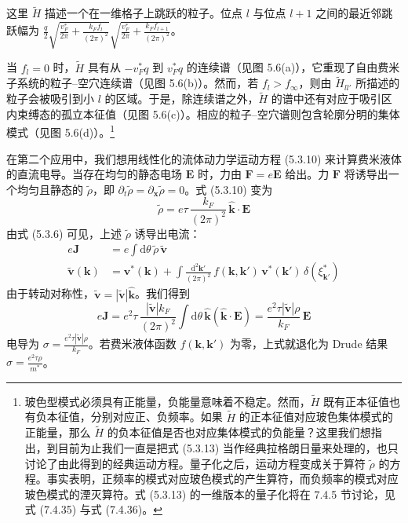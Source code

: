 这里 $\tilde{H}$ 描述一个在一维格子上跳跃的粒子。位点 $l$ 与位点 $l+1$ 之间的最近邻跳跃幅为
$\frac{q}{2}\sqrt{\frac{v_{F}^{*}}{2\pi}+\frac{k_{F}f_{l}}{(2\pi)^{2}}}\sqrt{\frac{v_{F}^{*}}{2\pi}+\frac{k_{F}f_{l+1}}{(2\pi)^{2}}}$。


当 $f_{l}=0$ 时，$\tilde{H}$ 具有从 $-v_{F}^{*}q$ 到 $v_{F}^{*}q$ 的连续谱（见图 5.6(a)），它重现了自由费米子系统的粒子--空穴连续谱（见图 5.6(b)）。然而，若 $f_{l}>f_{\infty}$，则由 $\tilde{H}_{ll'}$ 所描述的粒子会被吸引到小 $l$ 的区域。于是，除连续谱之外，$\tilde{H}$ 的谱中还有对应于吸引区内束缚态的孤立本征值（见图 5.6(c)）。相应的粒子--空穴谱则包含轮廓分明的集体模式（见图 5.6(d)）。\footnote{玻色型模式必须具有正能量，负能量意味着不稳定。然而，$\tilde{H}$ 既有正本征值也有负本征值，分别对应正、负频率。如果 $\tilde{H}$ 的正本征值对应玻色集体模式的正能量，那么 $\tilde{H}$ 的负本征值是否也对应集体模式的负能量？这里我们想指出，到目前为止我们一直是把式 (5.3.13) 当作经典拉格朗日量来处理的，也只讨论了由此得到的经典运动方程。量子化之后，运动方程变成关于算符 $\tilde{\rho}$ 的方程。事实表明，正频率的模式对应玻色模式的产生算符，而负频率的模式对应玻色模式的湮灭算符。式 (5.3.13) 的一维版本的量子化将在 7.4.5 节讨论，见式 (7.4.35) 与式 (7.4.36)。}

在第二个应用中，我们想用线性化的流体动力学运动方程 (5.3.10) 来计算费米液体的直流电导。当存在均匀的静态电场 $\pmb{E}$ 时，力由 $\pmb{F}=e\pmb{E}$ 给出。力 $\pmb{F}$ 将诱导出一个均匀且静态的 $\tilde{\rho}$，即 $\partial_{t}\tilde{\rho}=\partial_{\pmb{x}}\tilde{\rho}=0$。式 (5.3.10) 变为
\begin{equation*}
\tilde{\rho}=e\tau\,\frac{k_{F}}{(2\pi)^{2}}\,\hat{\pmb{k}}\cdot\pmb{E}
\end{equation*}
由式 (5.3.6) 可见，上述 $\tilde{\rho}$ 诱导出电流：
\begin{align*}
e\pmb{J} &= e\int \mathrm{d}\theta\,\tilde{\rho}\,\tilde{\pmb{v}}\\
\tilde{\pmb{v}}(\pmb{k}) &= \pmb{v}^{*}(\pmb{k})+\int \frac{\mathrm{d}^{2}\pmb{k}'}{(2\pi)^{2}}\,f(\pmb{k},\pmb{k}')\,\pmb{v}^{*}(\pmb{k}')\,\delta(\xi_{\pmb{k}'}^{*})
\end{align*}
由于转动对称性，$\tilde{\pmb{v}}=|\tilde{\pmb{v}}|\hat{\pmb{k}}$。我们得到
\begin{equation*}
e\pmb{J}=e^{2}\tau\,\frac{|\tilde{\pmb{v}}|k_{F}}{(2\pi)^{2}}\int \mathrm{d}\theta\,\hat{\pmb{k}}(\hat{\pmb{k}}\cdot\pmb{E})=\frac{e^{2}\tau|\tilde{\pmb{v}}|\rho}{k_{F}}\,\pmb{E}
\end{equation*}
电导为 $\sigma=\frac{e^{2}\tau|\tilde{\pmb{v}}|\rho}{k_{F}}$。若费米液体函数 $f(\pmb{k},\pmb{k}')$ 为零，上式就退化为 Drude 结果 $\sigma=\frac{e^{2}\tau\rho}{m^{*}}$。

